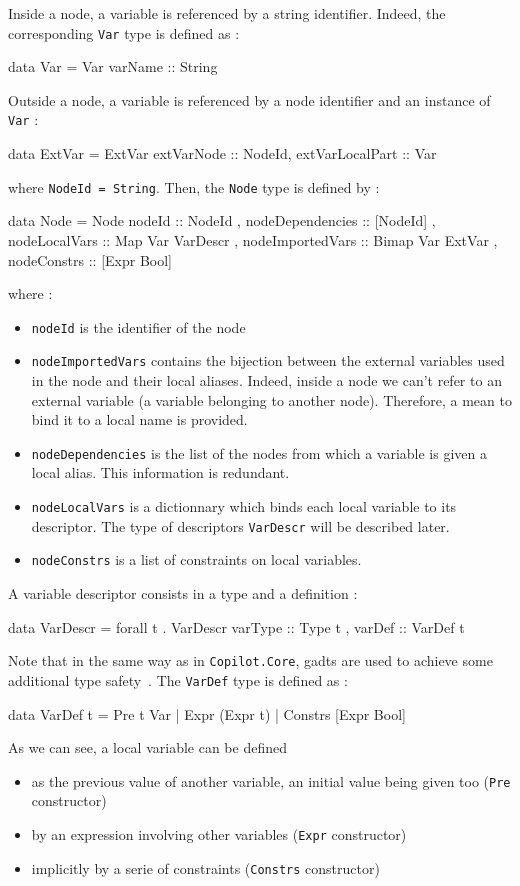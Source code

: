 Inside a node, a variable is referenced by a string identifier. Indeed, the corresponding \texttt{Var} type is defined as :
\begin{code}
data Var = Var {varName :: String}
\end{code}
Outside a node, a variable is referenced by a node identifier and an instance of \texttt{Var} :
\begin{code}
data ExtVar = ExtVar {extVarNode :: NodeId, extVarLocalPart :: Var} 
\end{code}
where \texttt{NodeId = String}. Then, the \texttt{Node} type is defined by :
\begin{code}
data Node = Node
  { nodeId            :: NodeId
  , nodeDependencies  :: [NodeId]
  , nodeLocalVars     :: Map Var VarDescr
  , nodeImportedVars  :: Bimap Var ExtVar 
  , nodeConstrs       :: [Expr Bool] }
\end{code} where :
\begin{itemize}
\item \texttt{nodeId} is the identifier of the node
\item \texttt{nodeImportedVars} contains the bijection between the external variables used in the node and their local aliases. Indeed, inside a node we can't refer to an external variable (a variable belonging to another node). Therefore, a mean to bind it to a local name is provided.
\item \texttt{nodeDependencies} is the list of the nodes from which a variable is given a local alias. This information is redundant.
\item \texttt{nodeLocalVars} is a dictionnary which binds each local variable to its descriptor. The type of descriptors \texttt{VarDescr} will be described later.
\item \texttt{nodeConstrs} is a list of constraints on local variables.
\end{itemize}
A variable descriptor consists in a type and a definition :
\begin{code}
data VarDescr = forall t . VarDescr
  { varType :: Type t
  , varDef  :: VarDef t }
\end{code}
Note that in the same way as in \texttt{Copilot.Core}, {\sc gadt}s are used to achieve some additional type safety~\cite{}. The \texttt{VarDef} type is defined as :
\begin{code}
data VarDef t =
    Pre t Var
  | Expr (Expr t)
  | Constrs [Expr Bool]
\end{code}
As we can see, a local variable can be defined
\begin{itemize}
\item as the previous value of another variable, an initial value being given too (\texttt{Pre} constructor)
\item by an expression involving other variables (\texttt{Expr} constructor)
\item implicitly by a serie of constraints (\texttt{Constrs} constructor)
\end{itemize}
